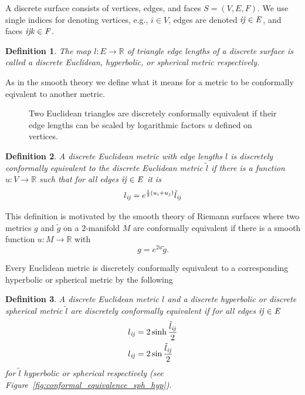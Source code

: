 \documentclass{book}
\newtheorem{definition}{Definition}
\newcommand{\R}{\mathbb R}
\begin{document}
A discrete surface consists of vertices, edges, and faces $S=(V, E, F)$. We use single indices for denoting vertices, e.g., $i \in V$, edges are denoted $\it{ij}\in E$, and faces $\it{ijk}\in F$.

\begin{definition}
The map $l:E\to \R$ of triangle edge lengths of a discrete surface is called a \emph{discrete Euclidean, hyperbolic, or spherical metric} respectively.
\end{definition}

As in the smooth theory we define what it means for a metric to be conformally eqivalent to another metric. 

\begin{figure}
\centering
\scalebox{0.5}{}
\caption[Euclidean conformal equivalence]{Two Euclidean triangles are discretely conformally equivalent if their edge lengths can be scaled by logarithmic factors $u$ defined on vertices.}
\label{fig:conformal_equivalence}
\end{figure}

\begin{definition}
\label{def:conformal_equivalence_euclidean}
A discrete Euclidean metric with edge lengths $l$ is \emph{discretely conformally equivalent} to the discrete Euclidean metric $\tilde l$ if there is a function $u:V\to \R$ such that for all edges $\it{ij}\in E$ it is
\begin{equation}
l_{\it{ij}} = e^{\frac{1}{2}(u_i + u_j)}\tilde l_{\it{ij}} \label{eq:euclidean_equivalence}
\end{equation}
\end{definition}

This definition is motivated by the smooth theory of Riemann surfaces where two metrics $g$ and $\tilde g$ on a $2$-manifold $M$ are conformally equivalent if there is a smooth function $u:M\to \R$ with \[g=e^{2u}\tilde g.\]

Every Euclidean metric is discretely conformally equivalent to a corresponding hyperbolic or spherical metric by the following

\begin{definition}
\label{def:conformal_equivalence_general}
A discrete Euclidean metric $l$ and a discrete hyperbolic or discrete spherical metric $\tilde l$ are \emph{discretely conformally equivalent} if for all edges $\it{ij}\in E$
\begin{align}
l_{\it{ij}} &= 2\sinh \frac{\tilde l_{\it{ij}}}{2} \label{eq:hyperbolic_equivalence}\\
l_{\it{ij}} &= 2\sin \frac{\tilde l_{\it{ij}}}{2} \label{eq:spherical_equivalence}
\end{align}
for $\tilde l$ hyperbolic or spherical respectively (see Figure~\ref{fig:conformal_equivalence_sph_hyp}).
\end{definition}
\end{document}
